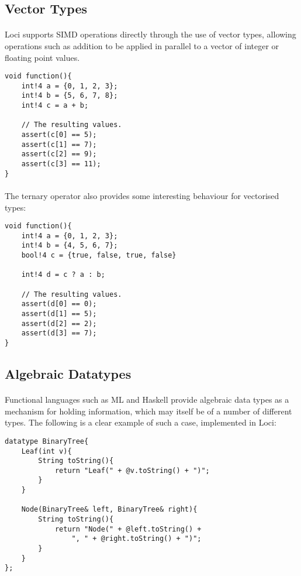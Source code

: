\documentclass[12pt,twoside,notitlepage]{report}
\begin{document}
\clearpage

\subsection{Vector Types}

\paragraph{}
Loci supports SIMD operations directly through the use of vector types, allowing operations such as addition to be applied in parallel to a vector of integer or floating point values.


\begin{lstlisting}
void function(){
	int!4 a = {0, 1, 2, 3};
	int!4 b = {5, 6, 7, 8};
	int!4 c = a + b;
	
	// The resulting values.
	assert(c[0] == 5);
	assert(c[1] == 7);
	assert(c[2] == 9);
	assert(c[3] == 11);
}
\end{lstlisting}


\paragraph{}
The ternary operator also provides some interesting behaviour for vectorised types:


\begin{lstlisting}
void function(){
	int!4 a = {0, 1, 2, 3};
	int!4 b = {4, 5, 6, 7};
	bool!4 c = {true, false, true, false}
	
	int!4 d = c ? a : b;
	
	// The resulting values.
	assert(d[0] == 0);
	assert(d[1] == 5);
	assert(d[2] == 2);
	assert(d[3] == 7);
}
\end{lstlisting}

\clearpage

\subsection{Algebraic Datatypes}

\paragraph{}
Functional languages such as ML and Haskell provide algebraic data types as a mechanism for holding information, which may itself be of a number of different types. The following is a clear example of such a case, implemented in Loci:


\begin{lstlisting}
datatype BinaryTree{
	Leaf(int v){
		String toString(){
			return "Leaf(" + @v.toString() + ")";
		}
	}
	
	Node(BinaryTree& left, BinaryTree& right){
		String toString(){
			return "Node(" + @left.toString() +
				", " + @right.toString() + ")";
		}
	}
};
\end{lstlisting}
\end{document}
